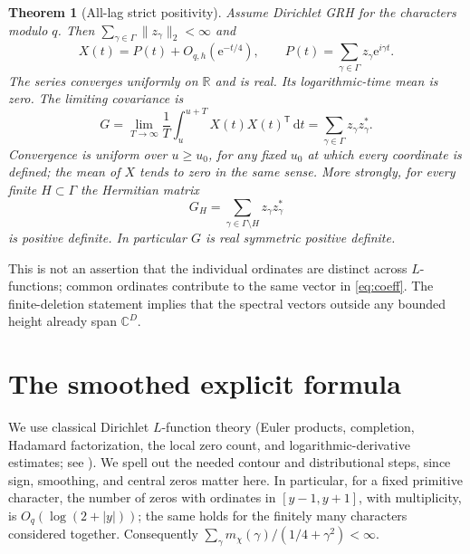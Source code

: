 \documentclass[11pt]{article}
\newtheorem{theorem}{Theorem}[section]
\theoremstyle{remark}\newtheorem{remark}[theorem]{Remark}
\newcommand{\C}{\mathbb C}
\newcommand{\R}{\mathbb R}
\newcommand{\dd}{\,\mathrm d}
\newcommand{\e}{\mathrm e}
\begin{document}
\begin{theorem}[All-lag strict positivity]\label{thm:main}
Assume Dirichlet GRH for the characters modulo $q$. Then $\sum_{\gamma\in\Gamma}\|z_\gamma\|_2<\infty$ and
\begin{equation}\label{eq:mainexp}
 X(t)=P(t)+O_{q,h}(\e^{-t/4}),\qquad P(t)=\sum_{\gamma\in\Gamma}z_\gamma\e^{i\gamma t}.
\end{equation}
The series converges uniformly on $\R$ and is real. Its logarithmic-time mean is zero. The limiting covariance is
\begin{equation}\label{eq:gram}
 G=\lim_{T\to\infty}\frac1T\int_u^{u+T}X(t)X(t)^{\mathsf T}\dd t
 =\sum_{\gamma\in\Gamma}z_\gamma z_\gamma^*.
\end{equation}
Convergence is uniform over $u\ge u_0$, for any fixed $u_0$ at which every coordinate is defined; the mean of $X$ tends to zero in the same sense. More strongly, for \emph{every finite} $H\subset\Gamma$ the Hermitian matrix
\[
 G_H=\sum_{\gamma\in\Gamma\setminus H}z_\gamma z_\gamma^*
\]
is positive definite. In particular $G$ is real symmetric positive definite.
\end{theorem}
This is not an assertion that the individual ordinates are distinct across $L$-functions; common ordinates contribute to the same vector in \eqref{eq:coeff}. The finite-deletion statement implies that the spectral vectors outside any bounded height already span $\C^D$.

\section{The smoothed explicit formula}
We use classical Dirichlet $L$-function theory (Euler products, completion, Hadamard factorization, the local zero count, and logarithmic-derivative estimates; see \cite{MV,Kou}). We spell out the needed contour and distributional steps, since sign, smoothing, and central zeros matter here. In particular, for a fixed primitive character, the number of zeros with ordinates in $[y-1,y+1]$, with multiplicity, is $O_q(\log(2+|y|))$; the same holds for the finitely many characters considered together. Consequently $\sum_\gamma m_\chi(\gamma)/(1/4+\gamma^2)<\infty$.
\end{document}
